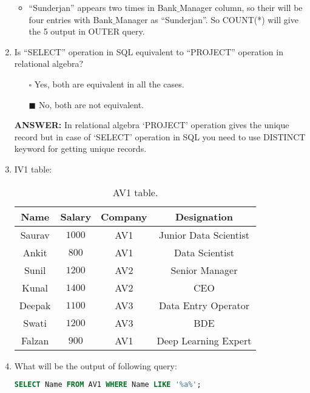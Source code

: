 \documentclass[10pt]{article}
\newcommand{\lightrule}{%
	\arrayrulecolor{black!30}%
	\midrule[\lightrulewidth]%
	\arrayrulecolor{black}}
\begin{document}
\begin{enumerate}
\begin{itemize}
				\item “Sunderjan” appears two times in Bank$\_$Manager column, so their will be four entries with Bank$\_$Manager as “Sunderjan”. So COUNT(*) will give the 5 output in OUTER query.
			\end{itemize}
		\newpage

		\item  Is “SELECT” operation in SQL equivalent to “PROJECT” operation in relational algebra?
			\begin{enumerate}
				\item[$\square$] Yes, both are equivalent in all the cases.
				\item[$\blacksquare$] No, both are not equivalent. 
			\end{enumerate}
			\color{red} \textbf{ANSWER:} \color{black} In relational algebra ‘PROJECT’ operation gives the unique record but in case of ‘SELECT’ operation in SQL you need to use DISTINCT keyword for getting unique records.
		
		\item IV1 table:
			\begin{table}[H]
				\centering
				\begin{tabular}{@{} *{4}{c} @{}}
					\toprule
						\textbf{Name} & \textbf{Salary} & \textbf{Company} & \textbf{Designation} \\
					\midrule
						Saurav & $1000$ & AV1 & Junior Data Scientist \\ 
					\lightrule
						Ankit & $800$ & AV1 & Data Scientist \\ 
					\lightrule
						Sunil & $1200$ & AV2 & Senior Manager \\ 
					\lightrule
						Kunal & $1400$ & AV2 & CEO \\ 
					\lightrule
						Deepak & $1100$ & AV3 & Data Entry Operator \\ 
					\lightrule
						Swati & $1200$ & AV3 & BDE \\ 
					\lightrule
						Falzan & $900$ & AV1 & Deep Learning Expert \\ 
					\bottomrule
				\end{tabular}
				\caption{AV1 table.}
			\end{table}

		\item What will be the output of following query: 
			\begin{lstlisting}[language=SQL,firstline=1, lastline=1] 
				SELECT Name FROM AV1 WHERE Name LIKE '%a%';
			\end{lstlisting}


\end{enumerate}
\end{document}
